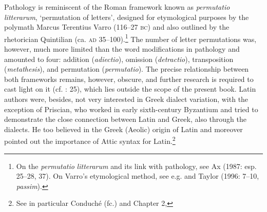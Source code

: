 \begin{styleCatalogusnotities}
Pathology is reminiscent of the Roman framework known as \textit{permutatio} \textit{litterarum}, ‘permutation of letters’, designed for etymological purposes by the polymath Marcus Terentius Varro (116–27 \textsc{bc}) and also outlined by the rhetorician Quintilian (ca. \textsc{ad} 35–100).\footnote{ \textrm{On the} \textrm{\textit{permutatio} \textit{litterarum} }\textrm{and its link with pathology, see Ax (1987: esp. 25–28, 37). On Varro’s etymological method, see e.g. \citet{Pfaffel1981} and Taylor (1996: 7–10,} \textrm{\textit{passim}}).} The number of letter permutations was, however, much more limited than the word modifications in pathology and amounted to four: addition (\textit{adiectio}), omission (\textit{detractio}), transposition (\textit{metathesis}), and permutation (\textit{permutatio}). The precise relationship between both frameworks remains, however, obscure, and further research is required to cast light on it (cf. \citealt{Ax1987}: 25), which lies outside the scope of the present book. Latin authors were, besides, not very interested in Greek dialect variation, with the exception of Priscian, who worked in early sixth-century Byzantium and tried to demonstrate the close connection between Latin and Greek, also through the dialects. He too believed in the Greek (Aeolic) origin of Latin and moreover pointed out the importance of Attic syntax for Latin.\footnote{ \textrm{See in particular Conduché (fc.) and Chapter 2, }}
\end{styleCatalogusnotities}

